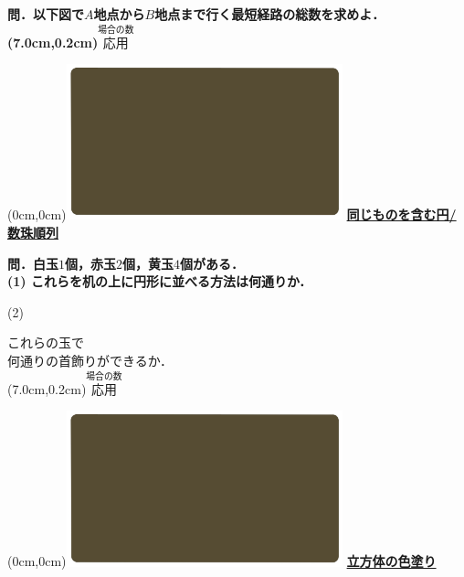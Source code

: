 \documentclass[10pt,
fleqn,
dvipdfmx,
uplatex
]{jsarticle}
\begin{document}
\LARGE 
\bf\boldmath 問．以下図で$A$地点から$B$地点まで行く最短経路の総数を求めよ．
\at(7.0cm,0.2cm){\small\color{bradorange}$\overset{\text{場合の数}}{\text{応用}}$}


\newpage



\at(0cm,0cm){\includegraphics[width=8cm,bb=0 0 1920 1080]{./youtube/thumbnails/templates/smart_background/場合の数.jpeg}}
{\color{orange}\bf\boldmath\Large\underline{同じものを含む円/数珠順列}}\vspace{0.3zw}

\normalsize
\bf\boldmath 問．白玉$1$個，赤玉$2$個，黄玉$4$個がある．\\
\hspace{-0.2zw}(1)\hspace{-0.2zw}  これらを机の上に円形に並べる方法は何通りか．\hspace{-0.5zw}


\hspace{-0.1zw}(2)

\LARGE
\vspace{-1zw}
\hspace{0.8zw} これらの玉で\\
\hfill 何通りの首飾りができるか．\\

\at(7.0cm,0.2cm){\small\color{bradorange}$\overset{\text{場合の数}}{\text{応用}}$}


\newpage



\at(0cm,0cm){\includegraphics[width=8cm,bb=0 0 1920 1080]{./youtube/thumbnails/templates/smart_background/場合の数.jpeg}}
{\color{orange}\bf\boldmath\huge\underline{立方体の色塗り}}\vspace{0.3zw}
\end{document}
